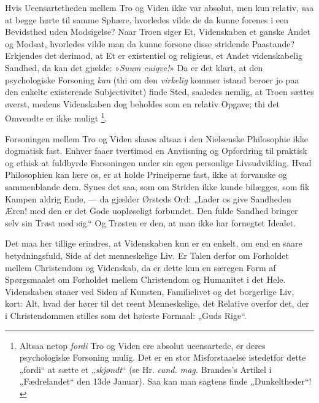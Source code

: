 \documentclass[12pt,a4paper]{book}
\newcommand{\opage}[1]{\marginnote{\footnotesize\textit{[#1]}}}
\begin{document}
Hvis Ueensartetheden mellem Tro og Viden ikke var
absolut, men kun relativ, saa at begge hørte til samme Sphære,
hvorledes vilde de da kunne forenes i een Bevidsthed uden
Modsigelse? Naar Troen siger Et, Videnskaben et ganske
Andet og Modsat, hvorledes vilde man da kunne forsone disse
stridende Paastande? Erkjendes det derimod, at Et er existentiel
og religieus, et Andet videnskabelig Sandhed, da kan det
gjælde: »\textit{Suum cuiqve!}» Da er det klart, at den psychologiske
Forsoning \emph{kan} (thi om den \emph{virkelig} kommer istand
beroer jo paa den enkelte existerende Subjectivitet) finde Sted,
saaledes nemlig, at Troen sættes øverst, medens Videnskaben
dog beholdes som en relativ Opgave; thi det Omvendte er
ikke muligt%
\footnote{Altsaa netop \emph{fordi} Tro og Viden ere absolut ueensartede, er deres
psychologiske Forsoning mulig. Det er en stor Misforstaaelse istedetfor
dette „fordi“ at sætte et „\emph{skjøndt}“ (se Hr. \textit{cand. mag.} Brandes's
Artikel i „Fædrelandet“ den 13de Januar). Saa kan man sagtens
finde „Dunkeltheder“!}.

Forsoningen mellem Tro og Viden slaaes altsaa i den
Nielsenske Philosophie ikke dogmatisk fast. Enhver faaer tvertimod
en Anviisning og Opfordring til praktisk og ethisk at
fuldbyrde Forsoningen under sin egen personlige Livsudvikling.
Hvad Philosophien kan lære os, er at holde Principerne fast,
\opage{42}\setcounter{footnote}{0}%
ikke at forvanske og sammenblande dem. Synes det saa, som
om Striden ikke kunde bilægges, som fik Kampen aldrig Ende, ---
da gjælder Ørsteds Ord: „Lader os give Sandheden Æren!
med den er det Gode uopløseligt forbundet. Den fulde Sandhed
bringer selv sin Trøst med sig.“ Og Trøsten er den, at man
ikke har fornegtet Idealet.

Det maa her tillige erindres, at Videnskaben kun er en
enkelt, om end en saare betydningsfuld, Side af det menneskelige
Liv. Er Talen derfor om Forholdet mellem Christendom
og Videnskab, da er dette kun en særegen Form af
Spørgsmaalet om Forholdet mellem Christendom og Humanitet
i det Hele. Videnskaben staaer ved Siden af Kunsten, Familielivet
og det borgerlige Liv, kort: Alt, hvad der hører til det
reent Menneskelige, det Relative overfor det, der i Christendommen
stilles som det høieste Formaal: „Guds Rige“.
\end{document}
